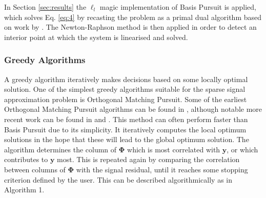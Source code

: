 In Section \ref{sec:results} the $\ell_l$ magic \cite{Candes2005} implementation of Basis Pursuit is applied, which solves Eq. \eqref{eq:4} by recasting the problem as a primal dual algorithm based on work by \cite{boyd2004convex}. The Newton-Raphson method is then applied in order to detect an interior point at which the system is linearised and solved. 
\subsubsection{Greedy Algorithms}
\label{sec:greedy-algorithm}
A greedy algorithm iteratively makes decisions based on some locally optimal solution. One of the simplest greedy algorithms suitable for the sparse signal approximation problem is Orthogonal Matching Pursuit. Some of the earliest Orthogonal Matching Pursuit algorithms can be found in \cite{pati1993, davis1997}, although notable more recent work can be found in  \cite{tropp2004} and \cite{tropp2007}. This method can often perform faster than Basis Pursuit due to its simplicity. It iteratively computes the local optimum solutions in the hope that these will lead to the global optimum solution. The algorithm determines the column of $\boldsymbol{\Phi}$ which is most correlated with $\boldsymbol{y}$, or which contributes to $\boldsymbol{y}$ most. This is repeated again by comparing the correlation between columns of $\boldsymbol{\Phi}$ with the signal residual, until it reaches some stopping criterion defined by the user.  This can be described algorithmically as in Algorithm 1.  


